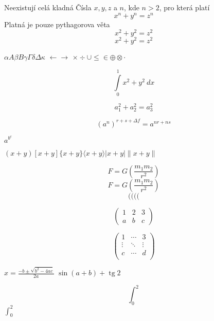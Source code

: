 \documentclass{article}
\DeclareMathOperator{\tg}{tg}
\begin{document}
    Neexistují celá kladná Čísla $x, y, z$ a $n$, kde $n > 2$, pro která platí
    \begin{equation}
        x^n + y^n = z^n
    \end{equation}
    Platná je pouze pythagorova věta
    \[x^2 + y^2 = z^2\]
    $$x^2 + y^2 = z^2$$

    $\alpha A \beta B \gamma \Gamma \delta \Delta \kappa$
    $\leftarrow \rightarrow$
    $\times \div \cup \leq \in \oplus \otimes \cdot$


    $$\int\limits_0^1 x^2 + y^2 \ dx$$

    $$a_1^2 + a_2^2 = a_3^2$$

    $$(a^n)^{r+s+\Delta f} = a^{nr+ns}$$

    $a^{b^c}$

    $(x+y)
    [x+y]
    \{ x+y \}
    \langle x + y \rangle
    |x+y|
    \|x+y\|$

    $$F = G (\frac{m_1 m_2}{r^2})$$
    $$F = G \left(\frac{m_1 m_2}{r^2}\right)$$
    $$\big( \Big( \bigg( \Bigg($$

    $$\begin{pmatrix}
        1 & 2 & 3\\
        a & b & c
    \end{pmatrix}$$

    $$\begin{pmatrix}
        1 & \cdots & 3\\
        \vdots & \ddots & \vdots \\
        c & \cdots & d \\
    \end{pmatrix}$$

    $x = \frac{-b \pm \sqrt{b^2 - 4ac}}{2a}$
    $\sin(a+b) + \tg{2}$

    $$\int^{2}_{0} $$
    $\int^{2}_{0} $
\end{document}

